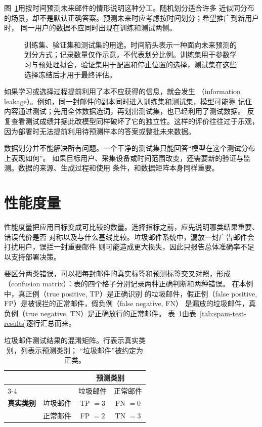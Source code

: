 图~\ref{fig:data-split-uses}用按时间预测未来邮件的情形说明这种分工。随机划分适合许多
近似同分布的场景，却不是默认正确答案。预测未来时应考虑按时间划分；希望推广到新用户时，
同一用户的数据不应同时出现在训练和测试两侧。

\begin{figure}[htbp]
  \centering
  
  \caption{训练集、验证集和测试集的用途。时间箭头表示一种面向未来预测的划分方式；记录数量仅作示意，不代表划分比例。训练集用于参数学习与预处理拟合，验证集用于配置和停止位置的选择，测试集在这些选择冻结后才用于最终评估。}
  \label{fig:data-split-uses}
\end{figure}

如果学习或选择过程提前利用了本不应获得的信息，就会发生
（information leakage）。例如，同一封邮件的副本同时进入训练集和测试集，模型可能靠
记住内容通过测试；先用全体数据选词，再划出测试集，也已经利用了测试数据。
反复查看测试成绩并据此改模型同样破坏了它的独立性。这样的评价往往过于乐观，
因为部署时无法提前利用待预测样本的答案或整批未来数据。

数据划分并不能解决所有问题。一个干净的测试集只能回答“模型在这个测试分布上表现如何”。
如果目标用户、采集设备或时间范围改变，还需要新的验证与监测。数据的来源、生成过程和使用
条件，和数据矩阵本身同样重要。

\section{性能度量}
\label{sec:performance-measures}

性能度量把应用目标变成可比较的数量。选择指标之前，应先说明哪类结果重要、错误代价是否
对称以及与什么基线比较。垃圾邮件系统中，漏放一封广告邮件会打扰用户，误拦一封重要邮件
则可能造成更大损失，因此只报告总体准确率不足以支持部署决策。

要区分两类错误，可以把每封邮件的真实标签和预测标签交叉对照，形成
（confusion matrix）：表的四个格子分别记录两种正确判断和两种错误。
在本例中，真正例（true positive, TP）是正确识别
的垃圾邮件，假正例（false positive, FP）是被误拦的正常邮件，假负例（false negative, FN）
是漏放的垃圾邮件，真负例（true negative, TN）是正确放行的正常邮件。
表~\ref{tab:spam-confusion-matrix}由表~\ref{tab:spam-test-results}逐行汇总而来。

\begin{table}[htbp]
  \centering
  \small
  \begin{tabular}{@{}llcc@{}}
    \toprule
    & & \multicolumn{2}{c}{\textbf{预测类别}} \\
    \cmidrule(l){3-4}
    & & 垃圾邮件 & 正常邮件 \\
    \midrule
    \textbf{真实类别} & 垃圾邮件 & TP $=3$ & FN $=0$ \\
                    & 正常邮件 & FP $=2$ & TN $=3$ \\
    \bottomrule
  \end{tabular}
  \caption{垃圾邮件测试结果的混淆矩阵。行表示真实类别，列表示预测类别；
  “垃圾邮件”被约定为正类。}
  \label{tab:spam-confusion-matrix}
\end{table}

